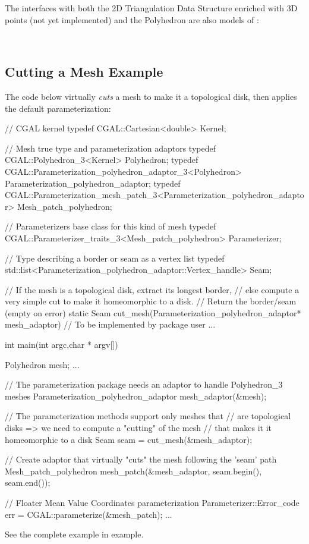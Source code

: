 The  interfaces with both the 2D
Triangulation Data Structure enriched with 3D points (not yet
implemented) and the Polyhedron are also models of
:

  \\


\subsection{Cutting a Mesh Example}

The code below virtually {\em cuts} a  mesh to make
it a topological disk, then applies the default parameterization:

\begin{ccExampleCode}

// CGAL kernel
typedef CGAL::Cartesian<double>                             Kernel;

// Mesh true type and parameterization adaptors
typedef CGAL::Polyhedron_3<Kernel>                          Polyhedron;
typedef CGAL::Parameterization_polyhedron_adaptor_3<Polyhedron>
                                                            Parameterization_polyhedron_adaptor;
typedef CGAL::Parameterization_mesh_patch_3<Parameterization_polyhedron_adaptor>
                                                            Mesh_patch_polyhedron;

// Parameterizers base class for this kind of mesh
typedef CGAL::Parameterizer_traits_3<Mesh_patch_polyhedron> Parameterizer;

// Type describing a border or seam as a vertex list
typedef std::list<Parameterization_polyhedron_adaptor::Vertex_handle>
                                                            Seam;

// If the mesh is a topological disk, extract its longest border,
// else compute a very simple cut to make it homeomorphic to a disk.
// Return the border/seam (empty on error)
static Seam cut_mesh(Parameterization_polyhedron_adaptor* mesh_adaptor)
{
    // To be implemented by package user
    ...
}

int main(int argc,char * argv[])
{
    Polyhedron mesh;
    ...

    // The parameterization package needs an adaptor to handle Polyhedron_3 meshes
    Parameterization_polyhedron_adaptor mesh_adaptor(&mesh);

    // The parameterization methods support only meshes that
    // are topological disks => we need to compute a "cutting" of the mesh
    // that makes it it homeomorphic to a disk
    Seam seam = cut_mesh(&mesh_adaptor);

    // Create adaptor that virtually "cuts" the mesh following the 'seam' path
    Mesh_patch_polyhedron   mesh_patch(&mesh_adaptor,
                                       seam.begin(),
                                       seam.end());

    // Floater Mean Value Coordinates parameterization
    Parameterizer::Error_code err = CGAL::parameterize(&mesh_patch);
    ...
}

\end{ccExampleCode}

See the complete example in 
example.


